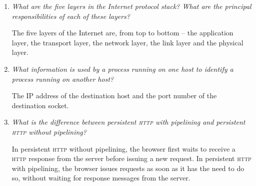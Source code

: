 \begin{enumerate}
  \item \emph{What are the five layers in the Internet protocol stack?
    What are the principal responsibilities of each of these layers?}

  The five layers of the Internet are, from top to bottom -- the
  application layer, the transport layer, the network layer, the link
  layer and the physical layer.

  \item \emph{What information is used by a process running on one
    host to identify a process running on another host?}

  The IP address of the destination host and the port number of the
  destination socket.

  \item \emph{What is the difference between persistent \textsc{http}
    with pipelining and persistent \textsc{http} without pipelining?}

  In persistent \textsc{http} without pipelining, the browser first
  waits to receive a \textsc{http} response from the server before
  issuing a new request. In persistent \textsc{http} with pipelining,
  the browser issues requests as soon as it has the need to do so,
  without waiting for response messages from the server.

\end{enumerate}

